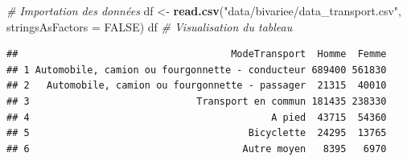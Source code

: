 \documentclass[
  11pt,
  french,
]{book}
\makeatletter
\newenvironment{Shaded}{\begin{snugshade}}{\end{snugshade}}
\newcommand{\CommentTok}[1]{\textcolor[rgb]{0.56,0.35,0.01}{\textit{#1}}}
\newcommand{\DataTypeTok}[1]{\textcolor[rgb]{0.13,0.29,0.53}{#1}}
\newcommand{\KeywordTok}[1]{\textcolor[rgb]{0.13,0.29,0.53}{\textbf{#1}}}
\newcommand{\NormalTok}[1]{#1}
\newcommand{\OtherTok}[1]{\textcolor[rgb]{0.56,0.35,0.01}{#1}}
\newcommand{\StringTok}[1]{\textcolor[rgb]{0.31,0.60,0.02}{#1}}
\newenvironment{kframe}{%
\medskip{}
\setlength{\fboxsep}{.8em}
 \def\at@end@of@kframe{}%
 \ifinner\ifhmode%
  \def\at@end@of@kframe{\end{minipage}}%
  \begin{minipage}{\columnwidth}%
 \fi\fi%
 \def\FrameCommand##1{\hskip\@totalleftmargin \hskip-\fboxsep
 \colorbox{shadecolor}{##1}\hskip-\fboxsep
     \hskip-\linewidth \hskip-\@totalleftmargin \hskip\columnwidth}%
 \MakeFramed {\advance\hsize-\width
   \@totalleftmargin\z@ \linewidth\hsize
   \@setminipage}}%
 {\par\unskip\endMakeFramed%
 \at@end@of@kframe}
\renewenvironment{Shaded}{\begin{kframe}}{\end{kframe}}
\makeatother
\begin{document}
\begin{Shaded}
\begin{Highlighting}[]
\CommentTok{# Importation des données}
\NormalTok{df <-}\StringTok{  }\KeywordTok{read.csv}\NormalTok{(}\StringTok{"data/bivariee/data_transport.csv"}\NormalTok{, }\DataTypeTok{stringsAsFactors =} \OtherTok{FALSE}\NormalTok{)}
\NormalTok{df }\CommentTok{# Visualisation du tableau}
\end{Highlighting}
\end{Shaded}

\begin{verbatim}
##                                     ModeTransport  Homme  Femme
## 1 Automobile, camion ou fourgonnette - conducteur 689400 561830
## 2   Automobile, camion ou fourgonnette - passager  21315  40010
## 3                             Transport en commun 181435 238330
## 4                                          A pied  43715  54360
## 5                                      Bicyclette  24295  13765
## 6                                     Autre moyen   8395   6970
\end{verbatim}
\end{document}
